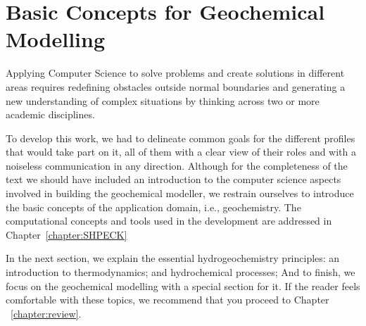 \chapter{Basic Concepts for Geochemical Modelling}
\label{chapter:basic}

Applying Computer Science to solve problems and create solutions in different areas requires redefining obstacles outside normal boundaries and generating a new understanding of complex situations by thinking across two or more academic disciplines. 

To develop this work, we had to delineate common goals for the different profiles that would take part on it, all of them with a clear view of their roles and with a noiseless communication in any direction. Although for the completeness of the text we should have included an introduction to the computer science aspects involved in building the geochemical modeller, we restrain ourselves to introduce the basic concepts of the application domain, i.e., geochemistry. The computational concepts and tools used in the development are addressed in Chapter~\ref{chapter:SHPECK}

In the next section, we explain the essential hydrogeochemistry principles: an introduction to thermodynamics; and hydrochemical processes; And to finish, we focus on the geochemical modelling with a special section for it. If the reader feels comfortable with these topics, we recommend that you proceed to Chapter ~\ref{chapter:review}.




